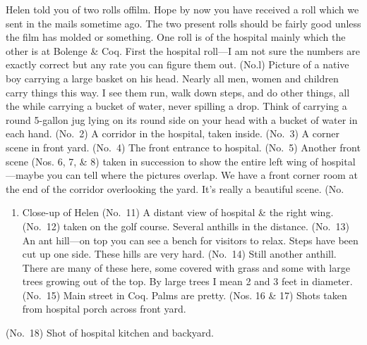 \documentclass[
]{book}
\providecommand{\tightlist}{%
  \setlength{\itemsep}{0pt}\setlength{\parskip}{0pt}}
\begin{document}
Helen told you of two rolls offilm. Hope by now you have received a roll which we sent in the mails sometime ago. The two present rolls should be fairly good unless the film has molded or something. One roll is of the hospital mainly which the other is at Bolenge \& Coq. First the hospital roll---I am not sure the numbers are exactly correct but any rate you can figure them out. (No.l) Picture of a native boy carrying a large basket on his head. Nearly all men, women and children carry things this way. I see them run, walk down steps, and do other things, all the while carrying a bucket of water, never spilling a drop. Think of carrying a round 5-gallon jug lying on its round side on your head with a bucket of water in each hand. (No.~2) A corridor in the hospital, taken inside. (No.~3) A corner scene in front yard. (No.~4) The front entrance to hospital. (No.~5) Another front scene (Nos. 6, 7, \& 8) taken in succession to show the entire left wing of hospital---maybe you can tell where the pictures overlap. We have a front corner room at the end of the corridor overlooking the yard. It's really a beautiful scene. (No.

\begin{enumerate}
\def\labelenumi{\arabic{enumi})}
\setcounter{enumi}{9}
\tightlist
\item
  Close-up of Helen (No.~11) A distant view of hospital \& the right wing. (No.~12) taken on the golf course. Several anthills in the distance. (No.~13) An ant hill---on top you can see a bench for visitors to relax. Steps have been cut up one side. These hills are very hard. (No.~14) Still another anthill. There are many of these here, some covered with grass and some with large trees growing out of the top. By large trees I mean 2 and 3 feet in diameter. (No.~15) Main street in Coq. Palms are pretty. (Nos. 16 \& 17) Shots taken from hospital porch across front yard.
\end{enumerate}

(No.~18) Shot of hospital kitchen and backyard.
\end{document}
